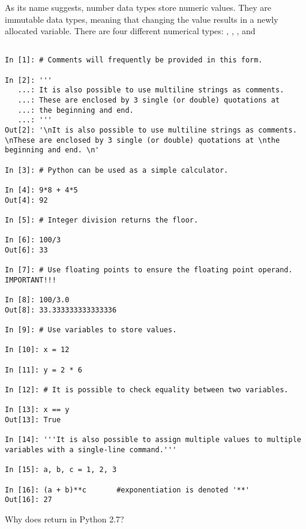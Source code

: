 \begin{example}
As its name suggests, number data types store numeric values. 
They are immutable data types, meaning that changing the value results in a 
newly allocated variable.
There are four different numerical types: , , 
, and 

\begin{lstlisting}

In [1]: # Comments will frequently be provided in this form. 

In [2]: '''
   ...: It is also possible to use multiline strings as comments. 
   ...: These are enclosed by 3 single (or double) quotations at 
   ...: the beginning and end. 
   ...: '''
Out[2]: '\nIt is also possible to use multiline strings as comments. \nThese are enclosed by 3 single (or double) quotations at \nthe beginning and end. \n'

In [3]: # Python can be used as a simple calculator.

In [4]: 9*8 + 4*5
Out[4]: 92

In [5]: # Integer division returns the floor.

In [6]: 100/3
Out[6]: 33

In [7]: # Use floating points to ensure the floating point operand. IMPORTANT!!!

In [8]: 100/3.0
Out[8]: 33.333333333333336

In [9]: # Use variables to store values.

In [10]: x = 12

In [11]: y = 2 * 6

In [12]: # It is possible to check equality between two variables.

In [13]: x == y
Out[13]: True

In [14]: '''It is also possible to assign multiple values to multiple variables with a single-line command.'''
		
In [15]: a, b, c = 1, 2, 3

In [16]: (a + b)**c       #exponentiation is denoted '**'
Out[16]: 27

\end{lstlisting}
\end{example}

\begin{problem}
Why does  return  in Python 2.7? 
\end{problem}

